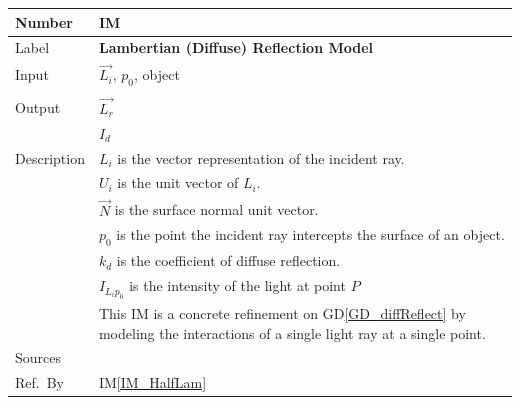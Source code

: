 \documentclass[12pt]{article}
\newcommand{\colAwidth}{0.13\textwidth}
\newcommand{\colBwidth}{0.82\textwidth}
\newcommand{\dref}[1]{GD\ref{#1}}
\newcounter{instnum} %
\newcommand{\iref}[1]{IM\ref{#1}}
\begin{document}
\noindent
\begin{minipage}{\textwidth}
	\renewcommand*{\arraystretch}{1.5}
	\begin{tabular}{| p{\colAwidth} | p{\colBwidth}|}
		\hline
		\rowcolor[gray]{0.9}
		Number& IM{instnum}\theinstnum \label{IM_LamDiffuse}\\
		\hline
		Label& \bf Lambertian (Diffuse) Reflection Model\\
		\hline
		Input& $\vec{L_{i}}$, $p_{0}$, object\\
		& \\
		\hline
		Output& $\vec{L_{r}}$  \\
		&  $I_{d}$\\
		\hline
		Description & $L_{i}$ is the vector representation of the incident 
		ray.\\
		& $U_{i}$ is the unit vector of $L_{i}$.\\
		& $\vec{N}$ is the surface normal unit vector. \\
		& $p_{0}$ is the point the incident ray intercepts the surface of an 
		object. \\
		& $k_{d}$  is the coefficient of diffuse reflection.\\
		& $I_{L_{i}p_{0}}$ is the intensity of the light at point $P$\\
		& This IM is a concrete refinement on \dref{GD_diffReflect} by modeling 
		the interactions of a single light ray at a single point.\\
		\hline
		Sources& \cite{Comninos2005,Lengyel2003,shreiner2012} \\
		\hline
		Ref.\ By & \iref{IM_HalfLam}\\
		\hline
	\end{tabular}
\end{minipage}\\

~\newline
\end{document}
